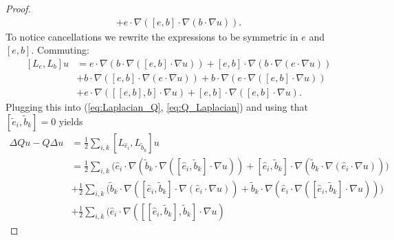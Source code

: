 \documentclass[11pt]{amsart}
\numberwithin{equation}{section}
\begin{document}
\begin{proof}
\begin{align*}
    +e\cdot\nabla\left([e,b]\cdot\nabla\left(b\cdot\nabla u\right)\right).
  \end{align*}
  To notice cancellations we rewrite the expressions to be symmetric in $e$ and $[e,b]$. Commuting:
  \begin{align*}
    \left[L_{e},L_{b}\right]u & 
    =e\cdot\nabla\left(b\cdot\nabla\left([e,b]\cdot\nabla u\right)\right)
    +[e,b]\cdot\nabla\left(b\cdot\nabla\left(e\cdot\nabla u\right)\right)\\
    & +b\cdot\nabla\left([e,b]\cdot\nabla(e\cdot\nabla u)\right)
    +b\cdot\nabla\left(e\cdot\nabla\left([e,b]\cdot\nabla u\right)\right)\\
    & +e\cdot\nabla\left(\left[[e,b],b\right]\cdot\nabla u\right)
    +\left[e,b\right]\cdot\nabla\left([e,b]\cdot\nabla u\right).
  \end{align*}
  Plugging this into (\ref{eq:Laplacian_Q}, \ref{eq:Q_Laplacian}) and using that $[\tilde{e}_{i},\tilde{b}_{k}]=0$ yields
  \begin{align}
    \Delta Qu-Q\Delta u & 
    =\frac{1}{2}\sum_{i,k}\left[L_{\hat{e}_{i}},L_{\tilde{b}_{k}}\right]u\nonumber \\
    & =\frac{1}{2}\sum_{i,k}\Big(\hat{e}_{i}\cdot\nabla\left(\tilde{b}_{k}\cdot\nabla\left([\hat{e}_{i},\tilde{b}_{k}]\cdot\nabla u\right)\right)
    +[\hat{e}_{i},\tilde{b}_{k}]\cdot\nabla\left(\tilde{b}_{k}\cdot\nabla\left(\hat{e}_{i}\cdot\nabla u\right)\right)\Big)\label{eq:vanish_EOT1}\\
    & +\frac{1}{2}\sum_{i,k}\Big(\tilde{b}_{k}\cdot\nabla\left([\hat{e}_{i},\tilde b_k]\cdot\nabla(\hat{e}_{i}\cdot\nabla u)\right)
    +\tilde{b}_{k}\cdot\nabla\left(\hat{e}_{i}\cdot\nabla\left([\hat{e}_{i},\tilde{b}_{k}]\cdot\nabla u\right)\right)\Big)\label{eq:vanish_EOT2}\\
    & +\frac{1}{2}\sum_{i,k}\Big(\hat{e}_{i}\cdot\nabla\left(\left[[\hat{e}_{i},\tilde{b}_{k}],\tilde{b}_{k}\right]\cdot\nabla u\right)

\end{align}
\end{proof}
\end{document}
